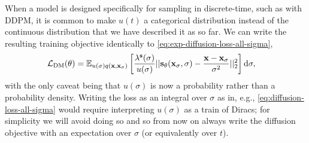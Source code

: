 When a model is designed specifically for sampling in discrete-time, such as with DDPM, it is common to make $u(t)$ a categorical distribution instead of the continuous distribution that we have described it as so far. 
We can write the resulting training objective identically to \cref{eq:exp-diffusion-loss-all-sigma},
\begin{align}
    \mathcal{L}_\text{DM}(\theta) &= \mathbb{E}_{u(\sigma)q({\mathbf{x}}, {\mathbf{x}}_\sigma)} \left[ \frac{\lambda^{\mathbf{s}}(\sigma)}{u(\sigma)} 
    || {\mathbf{s}}_\theta({\mathbf{x}}_\sigma, \sigma) - \frac{{\mathbf{x}}-{\mathbf{x}}_\sigma}{\sigma^2} ||_2^2 \right] \mathrm{d}\sigma,
\end{align}
with the only caveat being that $u(\sigma)$ is now a probability rather than a probability density. Writing the loss as an integral over $\sigma$ as in, e.g., \cref{eq:diffusion-loss-all-sigma} would require interpreting $u(\sigma)$ as a train of Diracs; for simplicity we will avoid doing so and so from now on always write the diffusion objective with an expectation over $\sigma$ (or equivalently over $t$).

